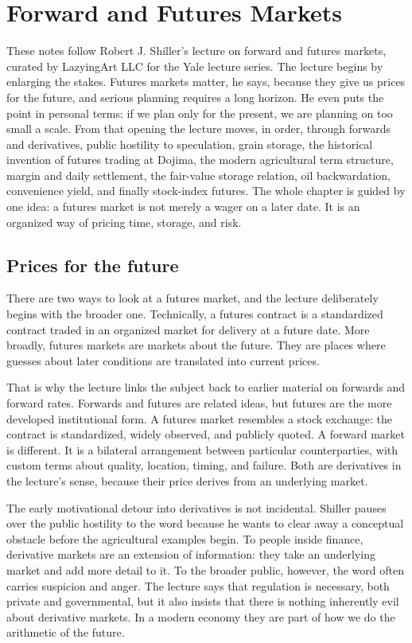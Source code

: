 \chapter{Forward and Futures Markets}

These notes follow Robert J. Shiller's lecture on forward and futures markets, curated by LazyingArt LLC for the Yale lecture series. The lecture begins by enlarging the stakes. Futures markets matter, he says, because they give us prices for the future, and serious planning requires a long horizon. He even puts the point in personal terms: if we plan only for the present, we are planning on too small a scale. From that opening the lecture moves, in order, through forwards and derivatives, public hostility to speculation, grain storage, the historical invention of futures trading at Dojima, the modern agricultural term structure, margin and daily settlement, the fair-value storage relation, oil backwardation, convenience yield, and finally stock-index futures. The whole chapter is guided by one idea: a futures market is not merely a wager on a later date. It is an organized way of pricing time, storage, and risk.

\section{Prices for the future}

There are two ways to look at a futures market, and the lecture deliberately begins with the broader one. Technically, a futures contract is a standardized contract traded in an organized market for delivery at a future date. More broadly, futures markets are markets about the future. They are places where guesses about later conditions are translated into current prices.

That is why the lecture links the subject back to earlier material on forwards and forward rates. Forwards and futures are related ideas, but futures are the more developed institutional form. A futures market resembles a stock exchange: the contract is standardized, widely observed, and publicly quoted. A forward market is different. It is a bilateral arrangement between particular counterparties, with custom terms about quality, location, timing, and failure. Both are derivatives in the lecture's sense, because their price derives from an underlying market.

The early motivational detour into derivatives is not incidental. Shiller pauses over the public hostility to the word because he wants to clear away a conceptual obstacle before the agricultural examples begin. To people inside finance, derivative markets are an extension of information: they take an underlying market and add more detail to it. To the broader public, however, the word often carries suspicion and anger. The lecture says that regulation is necessary, both private and governmental, but it also insists that there is nothing inherently evil about derivative markets. In a modern economy they are part of how we do the arithmetic of the future.

